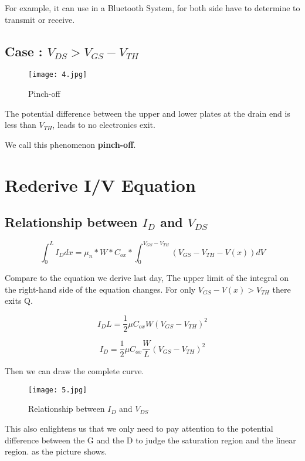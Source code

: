\documentclass[fontset=windows]{article}
\begin{document}
For example, it can use in a Bluetooth System, for both side have to determine to transmit or receive.

\subsection*{Case \uppercase\expandafter{}: $V_{DS}>V_{GS}-V_{TH}$}

\begin{figure}[htbp]
    \centering
    \texttt{[image: 4.jpg]}
    \captionsetup{labelformat=empty}
    \caption{Pinch-off}
    \label{4}
\end{figure}

The potential difference between the upper and lower plates at the drain end is less than $V_{TH}$, 
leads to no electronics exit.

We call this phenomenon \textbf{pinch-off}. 

\section*{Rederive I/V Equation}

\subsection*{Relationship between $I_D$ and $V_{DS}$}

$$\int_{0}^{L} I_Ddx=\mu_{n}*W*C_{ox}*\int_{0}^{V_{GS}-V_{TH}} (V_{GS}-V_{TH}-V(x))dV$$

Compare to the equation we derive last day, The upper limit of the integral on the right-hand side of the equation changes. 
For only $V_{GS}-V(x)>V_{TH}$ there exits Q. 

$$I_DL=\frac{1}{2} \mu C_{ox}W(V_{GS}-V_{TH})^2$$

$$I_D=\frac{1}{2} \mu C_{ox}\frac{W}{L}(V_{GS}-V_{TH})^2$$

Then we can draw the complete curve. 

\begin{figure}[htbp]
    \centering
    \texttt{[image: 5.jpg]}
    \captionsetup{labelformat=empty}
    \caption{Relationship between $I_D$ and $V_{DS}$}
    \label{5}
\end{figure}

This also enlightens us that we only need to pay attention to the potential difference between the G and the D 
to judge the saturation region and the linear region. as the picture shows. 
\end{document}
